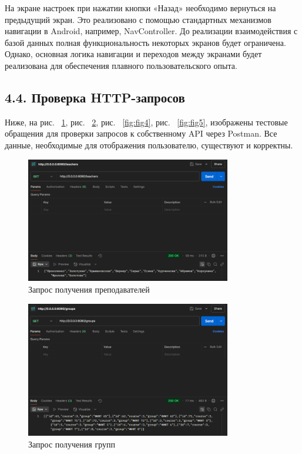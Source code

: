 \documentclass{vsureport}
\begin{document}
На экране настроек при нажатии кнопки «Назад» необходимо вернуться на предыдущий экран. Это реализовано с помощью стандартных механизмов навигации в Android, например, NavController. \cite{ref8}
До реализации взаимодействия с базой данных полная функциональность некоторых экранов будет ограничена. Однако, основная логика навигации и переходов между экранами будет реализована для обеспечения плавного пользовательского опыта.

\subsection*{4.4. Проверка HTTP-запросов}

Ниже, на рис. ~\ref{fig:fig2}, рис. ~\ref{fig:fig3}, рис. ~\ref{fig:fig4}, рис. ~\ref{fig:fig5}, изображены тестовые обращения для проверки запросов к собственному API через Postman. Все данные, необходимые для отображения пользователю, существуют и корректны.  \cite{ref9}

\begin{figure}[H]
	\centering
	\includegraphics[width=0.8\textwidth]{2.png}
	\caption{Запрос получения преподавателей}
	\label{fig:fig2}
\end{figure}

\begin{figure}[H]
	\centering
	\includegraphics[width=0.8\textwidth]{3.png}
	\caption{Запрос получения групп}
	\label{fig:fig3}
\end{figure}
\end{document}

